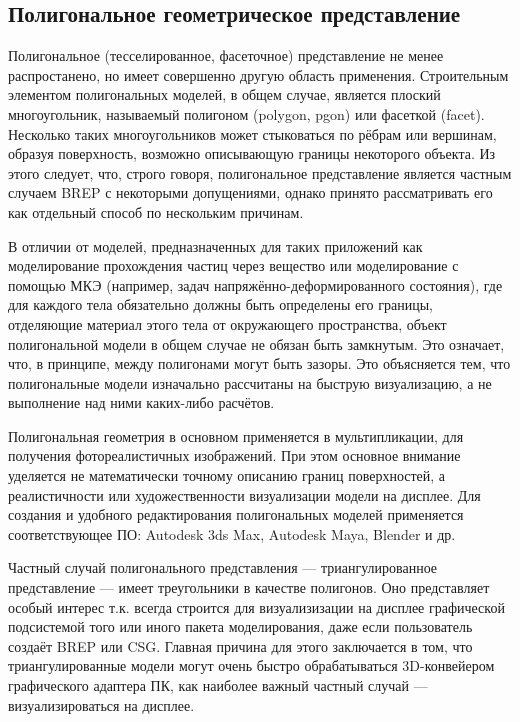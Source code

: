 \subsection{Полигональное геометрическое представление}\label{sec:secGeoPoly}

Полигональное (тесселированное, фасеточное) представление не менее распростанено, но имеет совершенно другую область применения. Строительным элементом полигональных моделей, в общем случае, является плоский многоугольник, называемый полигоном (polygon, pgon) или фасеткой (facet). Несколько таких многоугольников может стыковаться по рёбрам или вершинам, образуя поверхность, возможно описывающую границы некоторого объекта. Из этого следует, что, строго говоря, полигональное представление является частным случаем BREP с некоторыми допущениями, однако принято рассматривать его как отдельный способ по нескольким причинам.

В отличии от моделей, предназначенных для таких приложений как моделирование прохождения частиц через вещество или моделирование с помощью МКЭ (например, задач напряжённо-деформированного состояния), где для каждого тела обязательно должны быть определены его границы, отделяющие материал этого тела от окружающего пространства, объект полигональной модели в общем случае не обязан быть замкнутым. Это означает, что, в принципе, между полигонами могут быть зазоры. Это объясняется тем, что полигональные модели изначально рассчитаны на быструю визуализацию, а не выполнение над ними каких-либо расчётов.

Полигональная геометрия в основном применяется в мультипликации, для получения фотореалистичных изображений. При этом основное внимание уделяется не математически точному описанию границ поверхностей, а реалистичности или художественности визуализации модели на дисплее.
Для создания и удобного редактирования полигональных моделей применяется соответствующее ПО: Autodesk 3ds Max, Autodesk Maya, Blender и др.

Частный случай полигонального представления --- триангулированное представление --- имеет треугольники в качестве полигонов. Оно представляет особый интерес т.к. всегда строится для визуализизации на дисплее графической подсистемой того или иного пакета моделирования, даже если пользователь создаёт BREP или CSG. Главная причина для этого заключается в том, что триангулированные модели могут очень быстро обрабатываться 3D-конвейером графического адаптера ПК, как наиболее важный частный случай --- визуализироваться на дисплее.

